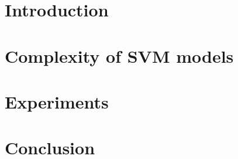 \documentclass[a4paper,10pt]{article}
\begin{document}


\tableofcontents
\thispagestyle{empty} %
\addtocounter{page}{-1}
\newpage


%
\section{Introduction}



\section{Complexity of SVM models}




\section{Experiments}




\section{Conclusion}





\end{document}
